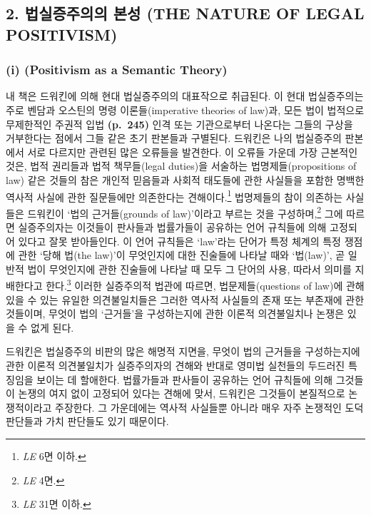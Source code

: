 \subsection{2. 법실증주의의 본성 (THE NATURE OF LEGAL
POSITIVISM)}\label{uxbc95uxc2e4uxc99duxc8fcuxc758uxc758-uxbcf8uxc131-the-nature-of-legal-positivism}

\subsubsection{\texorpdfstring{(i) 
(Positivism as a Semantic
Theory)}{(i) 의미론적 이론으로서의 실증주의 (Positivism as a Semantic Theory)}}\label{i-uxc758uxbbf8uxb860uxc801-uxc774uxb860uxc73cuxb85cuxc11cuxc758-uxc2e4uxc99duxc8fcuxc758-positivism-as-a-semantic-theory}

내 책은 드워킨에 의해 현대 법실증주의의 대표작으로 취급된다. 이 현대
법실증주의는 주로 벤담과 오스틴의 명령 이론들(imperative theories of
law)과, 모든 법이 법적으로 무제한적인 주권적 입법 \textbf{(p.~245)} 인격
또는 기관으로부터 나온다는 그들의 구상을 거부한다는 점에서 그들 같은
초기 판본들과 구별된다. 드워킨은 나의 법실증주의 판본에서 서로 다르지만
관련된 많은 오류들을 발견한다. 이 오류들 가운데 가장 근본적인 것은, 법적
권리들과 법적 책무들(legal duties)을 서술하는 법명제들(propositions of
law) 같은 것들의 참은 개인적 믿음들과 사회적 태도들에 관한 사실들을
포함한 명백한 역사적 사실에 관한 질문들에만 의존한다는
견해이다.\footnote{\emph{LE} 6면 이하.} 법명제들의 참이 의존하는
사실들은 드워킨이 ‘법의 근거들(grounds of law)’이라고 부르는 것을
구성하며,\footnote{\emph{LE} 4면.} 그에 따르면 실증주의자는 이것들이
판사들과 법률가들이 공유하는 언어 규칙들에 의해 고정되어 있다고 잘못
받아들인다. 이 언어 규칙들은 `law'라는 단어가 특정 체계의 특정 쟁점에
관한 ‘당해 법(the law)’이 무엇인지에 대한 진술들에 나타날 때와
‘법(law)’, 곧 일반적 법이 무엇인지에 관한 진술들에 나타날 때 모두 그
단어의 사용, 따라서 의미를 지배한다고 한다.\footnote{\emph{LE} 31면
  이하.} 이러한 실증주의적 법관에 따르면, 법문제들(questions of law)에
관해 있을 수 있는 유일한 의견불일치들은 그러한 역사적 사실들의 존재 또는
부존재에 관한 것들이며, 무엇이 법의 ‘근거들’을 구성하는지에 관한 이론적
의견불일치나 논쟁은 있을 수 없게 된다.

드워킨은 법실증주의 비판의 많은 해명적 지면을, 무엇이 법의 근거들을
구성하는지에 관한 이론적 의견불일치가 실증주의자의 견해와 반대로 영미법
실천들의 두드러진 특징임을 보이는 데 할애한다. 법률가들과 판사들이
공유하는 언어 규칙들에 의해 그것들이 논쟁의 여지 없이 고정되어 있다는
견해에 맞서, 드워킨은 그것들이 본질적으로 논쟁적이라고 주장한다. 그
가운데에는 역사적 사실들뿐 아니라 매우 자주 논쟁적인 도덕 판단들과 가치
판단들도 있기 때문이다.

